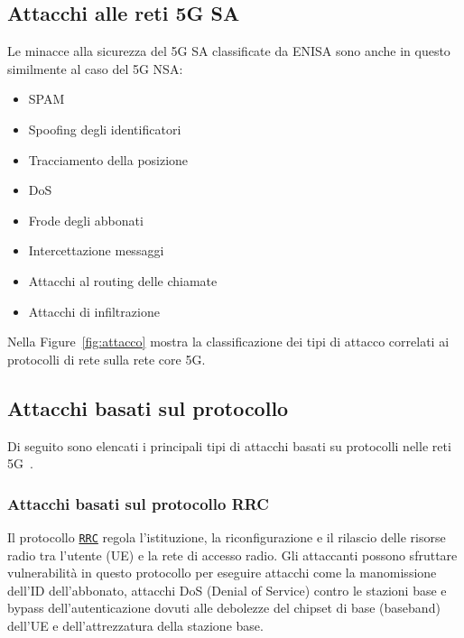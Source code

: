 \documentclass[english]{article}
\begin{document}
\subsection{Attacchi alle reti 5G SA}
Le minacce alla sicurezza del 5G SA classificate da ENISA sono anche in questo
similmente al caso del 5G NSA:\@
\begin{itemize}
	\item SPAM
	\item Spoofing degli identificatori
	\item Tracciamento della posizione
	\item DoS
	\item Frode degli abbonati
	\item Intercettazione messaggi
	\item Attacchi al routing delle chiamate
	\item Attacchi di infiltrazione
\end{itemize}

Nella Figure~\ref{fig:attacco} mostra la classificazione dei tipi di attacco
correlati ai protocolli di rete sulla rete core 5G.

\subsection{Attacchi basati sul protocollo}
Di seguito sono elencati i principali tipi di attacchi basati su protocolli
nelle reti 5G~\cite{Kim20205G}.

\subsubsection{Attacchi basati sul protocollo RRC}
Il protocollo \texttt{\hyperlink{RRC}{RRC}} regola l'istituzione, la
riconfigurazione e il rilascio delle risorse radio tra l'utente (UE) e la rete
di accesso radio. Gli attaccanti possono sfruttare vulnerabilità in questo
protocollo per eseguire attacchi come la manomissione dell'ID dell'abbonato,
attacchi DoS (Denial of Service) contro le stazioni base e bypass
dell'autenticazione dovuti alle debolezze del chipset di base (baseband)
dell'UE e dell'attrezzatura della stazione base.
\end{document}
